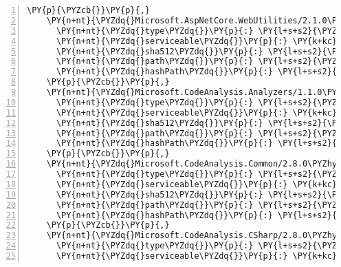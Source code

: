 \begin{Verbatim}[commandchars=\\\{\},numbers=left,firstnumber=1,stepnumber=1,numberblanklines=0]
    \PY{p}{\PYZcb{}}\PY{p}{,}
    \PY{n+nt}{\PYZdq{}Microsoft.AspNetCore.WebUtilities/2.1.0\PYZhy{}rc1\PYZhy{}final\PYZdq{}}\PY{p}{:} \PY{p}{\PYZob{}}
      \PY{n+nt}{\PYZdq{}type\PYZdq{}}\PY{p}{:} \PY{l+s+s2}{\PYZdq{}package\PYZdq{}}\PY{p}{,}
      \PY{n+nt}{\PYZdq{}serviceable\PYZdq{}}\PY{p}{:} \PY{k+kc}{true}\PY{p}{,}
      \PY{n+nt}{\PYZdq{}sha512\PYZdq{}}\PY{p}{:} \PY{l+s+s2}{\PYZdq{}sha512\PYZhy{}MNUWXN5M7UOBTXljZo/qU+nM73UtSeb3h9JLUCqSuPCNzPPn7R90UzUP0noKs7XFHX9uE1l4wDkJTNxfniy8bA==\PYZdq{}}\PY{p}{,}
      \PY{n+nt}{\PYZdq{}path\PYZdq{}}\PY{p}{:} \PY{l+s+s2}{\PYZdq{}microsoft.aspnetcore.webutilities/2.1.0\PYZhy{}rc1\PYZhy{}final\PYZdq{}}\PY{p}{,}
      \PY{n+nt}{\PYZdq{}hashPath\PYZdq{}}\PY{p}{:} \PY{l+s+s2}{\PYZdq{}microsoft.aspnetcore.webutilities.2.1.0\PYZhy{}rc1\PYZhy{}final.nupkg.sha512\PYZdq{}}
    \PY{p}{\PYZcb{}}\PY{p}{,}
    \PY{n+nt}{\PYZdq{}Microsoft.CodeAnalysis.Analyzers/1.1.0\PYZdq{}}\PY{p}{:} \PY{p}{\PYZob{}}
      \PY{n+nt}{\PYZdq{}type\PYZdq{}}\PY{p}{:} \PY{l+s+s2}{\PYZdq{}package\PYZdq{}}\PY{p}{,}
      \PY{n+nt}{\PYZdq{}serviceable\PYZdq{}}\PY{p}{:} \PY{k+kc}{true}\PY{p}{,}
      \PY{n+nt}{\PYZdq{}sha512\PYZdq{}}\PY{p}{:} \PY{l+s+s2}{\PYZdq{}sha512\PYZhy{}HS3iRWZKcUw/8eZ/08GXKY2Bn7xNzQPzf8gRPHGSowX7u7XXu9i9YEaBeBNKUXWfI7qjvT2zXtLUvbN0hds8vg==\PYZdq{}}\PY{p}{,}
      \PY{n+nt}{\PYZdq{}path\PYZdq{}}\PY{p}{:} \PY{l+s+s2}{\PYZdq{}microsoft.codeanalysis.analyzers/1.1.0\PYZdq{}}\PY{p}{,}
      \PY{n+nt}{\PYZdq{}hashPath\PYZdq{}}\PY{p}{:} \PY{l+s+s2}{\PYZdq{}microsoft.codeanalysis.analyzers.1.1.0.nupkg.sha512\PYZdq{}}
    \PY{p}{\PYZcb{}}\PY{p}{,}
    \PY{n+nt}{\PYZdq{}Microsoft.CodeAnalysis.Common/2.8.0\PYZhy{}beta3\PYZdq{}}\PY{p}{:} \PY{p}{\PYZob{}}
      \PY{n+nt}{\PYZdq{}type\PYZdq{}}\PY{p}{:} \PY{l+s+s2}{\PYZdq{}package\PYZdq{}}\PY{p}{,}
      \PY{n+nt}{\PYZdq{}serviceable\PYZdq{}}\PY{p}{:} \PY{k+kc}{true}\PY{p}{,}
      \PY{n+nt}{\PYZdq{}sha512\PYZdq{}}\PY{p}{:} \PY{l+s+s2}{\PYZdq{}sha512\PYZhy{}yCLGyxwdrzYYyqKYQZz7ELEvgFFJBV1h4Z4xis6vCcvV95e3oo591zJdoKlobdtKimmX9etz7yVBoB8y3nCxmA==\PYZdq{}}\PY{p}{,}
      \PY{n+nt}{\PYZdq{}path\PYZdq{}}\PY{p}{:} \PY{l+s+s2}{\PYZdq{}microsoft.codeanalysis.common/2.8.0\PYZhy{}beta3\PYZdq{}}\PY{p}{,}
      \PY{n+nt}{\PYZdq{}hashPath\PYZdq{}}\PY{p}{:} \PY{l+s+s2}{\PYZdq{}microsoft.codeanalysis.common.2.8.0\PYZhy{}beta3.nupkg.sha512\PYZdq{}}
    \PY{p}{\PYZcb{}}\PY{p}{,}
    \PY{n+nt}{\PYZdq{}Microsoft.CodeAnalysis.CSharp/2.8.0\PYZhy{}beta3\PYZdq{}}\PY{p}{:} \PY{p}{\PYZob{}}
      \PY{n+nt}{\PYZdq{}type\PYZdq{}}\PY{p}{:} \PY{l+s+s2}{\PYZdq{}package\PYZdq{}}\PY{p}{,}
      \PY{n+nt}{\PYZdq{}serviceable\PYZdq{}}\PY{p}{:} \PY{k+kc}{true}\PY{p}{,}

\end{Verbatim}
